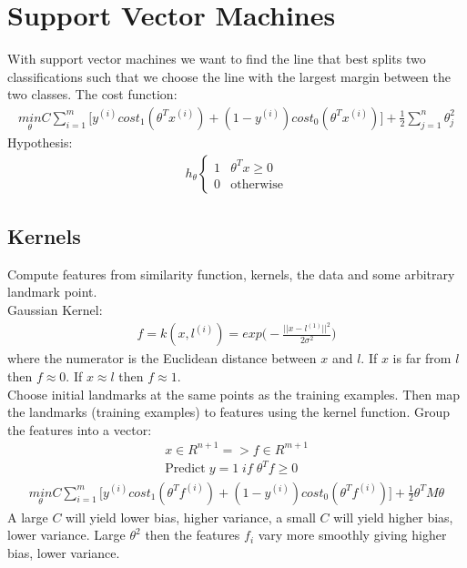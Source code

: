 \documentclass[12pt]{article}
\begin{document}
\section{Support Vector Machines}
With support vector machines we want to find the line that best splits two classifications such that we choose the line with the largest margin between the two classes. 
The cost function:
\begin{align*}
\underset{\theta}{min}C\sum_{i=1}^{m}\bigg[y^{(i)}cost_1(\theta^Tx^{(i)})+(1-y^{(i)})cost_0(\theta^Tx^{(i)})\bigg] + \frac{1}{2}\sum_{j=1}^{n}\theta_j^2
\end{align*}
Hypothesis:
\begin{align*}
	h_\theta \begin{cases}
		1 & \theta^Tx\ge 0 \\
		0 & \text{otherwise}
	\end{cases}
\end{align*}

\subsection{Kernels}
Compute features from similarity function, kernels, the data and some arbitrary landmark point. \\

Gaussian Kernel:
\begin{align*}
	f = k(x, l^{(i)})=exp\bigg(-\frac{||x-l^{(1)}||^2}{2\sigma^2}\bigg)
\end{align*}
where the numerator is the Euclidean distance between $x$ and $l$. If $x$ is far from $l$ then $f\approx 0$.  If $x\approx l$ then $f\approx 1$. \\ 

Choose initial landmarks at the same points as the training examples. Then map the landmarks (training examples) to features using the kernel function. Group the features into a vector:
\begin{align*}
	x\in R^{n+1} => f\in R^{m+1} \\
	\text{Predict}\; y=1\; if\; \theta^Tf\ge 0
\end{align*} 
\begin{align*}
\underset{\theta}{min}C\sum_{i=1}^{m}\bigg[y^{(i)}cost_1(\theta^Tf^{(i)})+(1-y^{(i)})cost_0(\theta^Tf^{(i)})\bigg] + \frac{1}{2}\theta^TM\theta
\end{align*}
 A large $C$ will yield lower bias, higher variance, a small $C$ will yield higher bias, lower variance. Large $\theta^2$ then the features $f_i$ vary more smoothly giving higher bias, lower variance. \\
 
\end{document}
